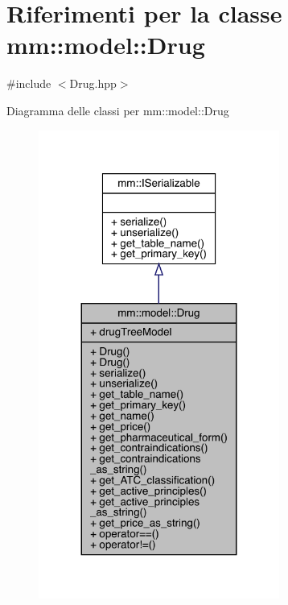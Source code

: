 \hypertarget{classmm_1_1model_1_1_drug}{}\section{Riferimenti per la classe mm\+:\+:model\+:\+:Drug}
\label{classmm_1_1model_1_1_drug}


{\ttfamily \#include $<$Drug.\+hpp$>$}



Diagramma delle classi per mm\+:\+:model\+:\+:Drug\nopagebreak
\begin{figure}[H]
\begin{center}
\leavevmode
\includegraphics[width=224pt]{d1/d98/classmm_1_1model_1_1_drug__inherit__graph}
\end{center}
\end{figure}


